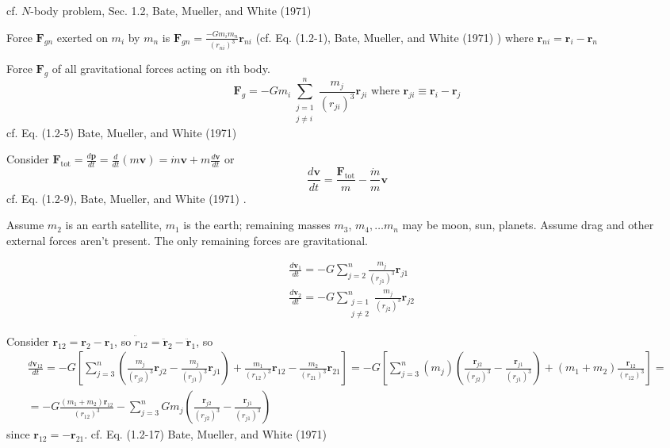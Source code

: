 \documentclass[10pt]{amsart}
\begin{document}
\begin{multicols*}{2}
cf. $N$-body problem, Sec. 1.2, Bate, Mueller, and White (1971) \cite{BMW1971}

Force $\mathbf{F}_{gn}$ exerted on $m_i$ by $m_n$ is $\mathbf{F}_{gn} = \frac{ - Gm_i m_n }{ (r_{ni})^3 } \mathbf{r}_{ni}$ (cf. Eq. (1.2-1), Bate, Mueller, and White (1971) \cite{BMW1971}) where $\mathbf{r}_{ni} = \mathbf{r}_i - \mathbf{r}_n$

Force $\mathbf{F}_g$ of all gravitational forces acting on $i$th body.
\begin{equation}
	\mathbf{F}_g = -Gm_i \sum_{ \substack{ j=1 \\ j \neq i } }^n \frac{m_j}{ (r_{ji})^3 } \mathbf{r}_{ji} \text{ where } \mathbf{r}_{ji} \equiv \mathbf{r}_i - \mathbf{r}_j
\end{equation} cf. Eq. (1.2-5) Bate, Mueller, and White (1971) \cite{BMW1971}



Consider $\mathbf{F}_{\text{tot}} = \frac{d\mathbf{p}}{dt} = \frac{d}{dt} (m\mathbf{v}) = \dot{m} \mathbf{v} + m \frac{d\mathbf{v}}{dt} $ or 
\begin{equation}
	\frac{d\mathbf{v}}{dt} = \frac{ \mathbf{F}_{\text{tot}} }{ m} - \frac{\dot{m}}{m} \mathbf{v}
\end{equation}
cf. Eq. (1.2-9), Bate, Mueller, and White (1971) \cite{BMW1971}.

Assume $m_2$ is an earth satellite, $m_1$ is the earth; remaining masses $m_3$, $m_4, \dots m_n$ may be moon, sun, planets. Assume drag and other external forces aren't present. The only remaining forces are gravitational.

\[
\begin{aligned}
	& \frac{d\mathbf{v}_1}{dt} = -G \sum_{j=2}^n \frac{m_j}{(r_{j1})^3} \mathbf{r}_{j1} \\
	& \frac{d\mathbf{v}_2}{dt} = -G \sum_{ \substack{ j = 1 \\ j\neq 2} }^n \frac{m_j}{(r_{j2})^3} \mathbf{r}_{j2} 
\end{aligned}
\]

Consider $\mathbf{r}_{12} = \mathbf{r}_2 - \mathbf{r}_1$, so $\ddot{\widehat{r}}_{12} = \ddot{\mathbf{r}}_2 - \ddot{\mathbf{r}}_1$, so
\begin{equation}
	\begin{gathered}
		\frac{d\mathbf{v}_{12}}{dt} = -G \left[ \sum_{j=3}^n \left( \frac{m_j}{ (r_{j2})^3 } \mathbf{r}_{j2} - \frac{m_j}{ (r_{j1})^3 } \mathbf{r}_{j1} \right) + \frac{m_1}{ (r_{12})^3 } \mathbf{r}_{12} - \frac{m_2}{ (r_{21})^3 } \mathbf{r}_{21} \right] = -G \left[ \sum_{j=3}^n (m_j) \left( \frac{ \mathbf{r}_{j2} }{ (r_{j2})^3 } - \frac{ \mathbf{r}_{j1} }{ (r_{j1})^3 } \right) + (m_1 + m_2) \frac{ \mathbf{r}_{12} }{ (r_{12})^3 } \right] = \\
		= - G \frac{ (m_1+ m_2) \mathbf{r}_{12} }{ (r_{12})^3 } - \sum_{j=3}^n Gm_j \left( \frac{ \mathbf{r}_{j2} }{ (r_{j2})^3 } - \frac{ \mathbf{r}_{j1} }{ (r_{j1})^3 } \right)
	\end{gathered}
\end{equation}
since $\mathbf{r}_{12} = - \mathbf{r}_{21}$. cf. Eq. (1.2-17) Bate, Mueller, and White (1971) \cite{BMW1971}


\end{multicols*}
\end{document}
